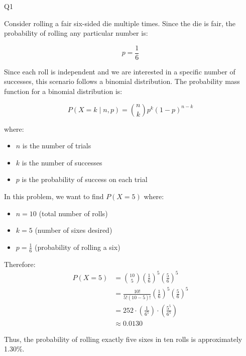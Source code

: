 \question Q1\droppoints

\begin{solution}
    Consider rolling a fair six-sided die multiple times.
    Since the die is fair, the probability of rolling any particular number is:

    \[
        p = \frac{1}{6}
    \]

    Since each roll is independent and we are interested in a specific number of successes, this scenario follows a binomial distribution.
    The probability mass function for a binomial distribution is:

    \[
        P(X = k \mid n, p) = \binom{n}{k} p^k(1 - p)^{n-k}
    \]

    where:
    \begin{itemize}
        \item $n$ is the number of trials
        \item $k$ is the number of successes
        \item $p$ is the probability of success on each trial
    \end{itemize}

    In this problem, we want to find $P(X = 5)$ where:
    \begin{itemize}
        \item $n = 10$ (total number of rolls)
        \item $k = 5$ (number of sixes desired)
        \item $p = \frac{1}{6}$ (probability of rolling a six)
    \end{itemize}

    Therefore:
    \[
        \begin{aligned}
            P(X = 5) &= \binom{10}{5} \left(\frac{1}{6}\right)^5 \left(\frac{5}{6}\right)^5 \\[1ex]
            &= \frac{10!}{5!(10-5)!} \left(\frac{1}{6}\right)^5 \left(\frac{5}{6}\right)^5 \\[1ex]
            &= 252 \cdot \left(\frac{1}{6^5}\right) \cdot \left(\frac{5^5}{6^5}\right) \\[1ex]
            &\approx 0.0130
        \end{aligned}
    \]

    Thus, the probability of rolling exactly five sixes in ten rolls is approximately 1.30\%.
\end{solution}